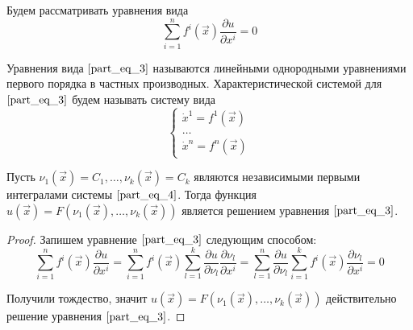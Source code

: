 Будем рассматривать уравнения вида
\begin{equation}
	\sum \limits_{i = 1}^{n} f^{i} \left( \vec{x} \right) \frac{\partial u}{\partial x^{i}} = 0 
	\label{part_eq_3}
\end{equation}

\begin{definition}
	Уравнения вида $\eqref{part_eq_3}$ называются линейными однородными уравнениями первого порядка в частных производных. Характеристической системой для $\eqref{part_eq_3}$ будем называть систему вида
	\begin{equation}
		\begin{cases}
			\dot{x}^1 = f^1 \left( \vec{x} \right) \\
			\dots                                             \\
			\dot{x}^n = f^n \left( \vec{x} \right) 
		\end{cases}
		\label{part_eq_4}
	\end{equation}
\end{definition}

\begin{theorem}
	Пусть $\nu_1 \left( \vec{x} \right) = C_1, \dots, \nu_k \left( \vec{x} \right) = C_k$ являются независимыми первыми интегралами системы $\eqref{part_eq_4}$. Тогда функция $u \left( \vec{x} \right) = F \left( \nu_1 \left( \vec{x} \right), \dots, \nu_k \left( \vec{x} \right) \right) $ является решением уравнения $\eqref{part_eq_3}$.
\end{theorem}
\begin{proof}
	Запишем уравнение $\eqref{part_eq_3}$ следующим способом:
	\begin{equation*}
		\sum \limits_{i = 1}^{n} f^{i} \left( \vec{x} \right)  \frac{\partial u}{\partial x^{i}} = \sum \limits_{i = 1}^{n} f^{i} \left( \vec{x} \right)  \sum \limits_{l = 1}^{k} \frac{\partial u}{\partial \nu_l} \frac{\partial \nu_l}{\partial x^{i}} = \sum \limits_{l = 1}^{n} \frac{\partial u}{\partial \nu_l} \sum \limits_{i = 1}^{k} f^{i} \left( \vec{x} \right)  \frac{\partial \nu_l}{\partial x^{i}} = 0
	\end{equation*}
	
	Получили тождество, значит $u \left( \vec{x} \right) = F \left( \nu_1 \left( \vec{x} \right), \dots, \nu_k \left( \vec{x} \right) \right)$ действительно решение уравнения $\eqref{part_eq_3}$.
\end{proof}

